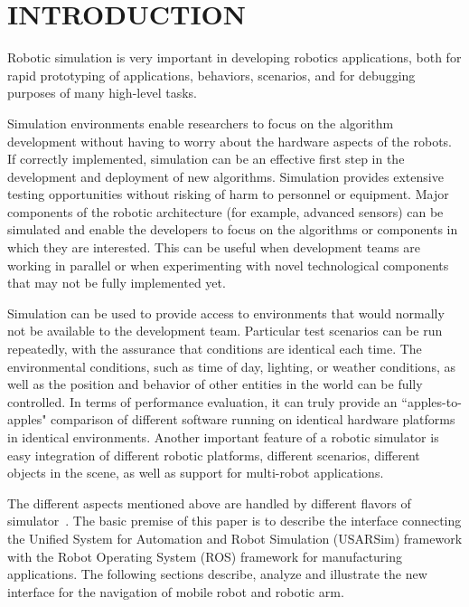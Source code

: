 \section*{INTRODUCTION}

Robotic simulation is very important in developing robotics applications, both
for rapid prototyping of applications, behaviors, scenarios, and for debugging
purposes of many high-level tasks.

Simulation environments enable researchers to focus on the algorithm development without having to worry about the hardware aspects of the robots. If correctly implemented, simulation can be an effective first step in the development and deployment of new algorithms. Simulation provides extensive testing opportunities without risking of harm to personnel or equipment. Major components of the robotic architecture (for example, advanced sensors) can be simulated and enable the developers to focus on the algorithms or components in which they are interested. This can be useful when development teams are working in parallel or when experimenting with novel technological components that may not be fully implemented yet.

Simulation can be used to provide access to environments that would normally not be available to the development team. Particular test scenarios can be run repeatedly, with the assurance that conditions are identical each time. The environmental conditions, such as time of day, lighting, or weather conditions, as well as the position and behavior of other entities in the world can be fully controlled. In terms of performance evaluation, it can truly provide an ``apples-to-apples" comparison of different software running on identical hardware platforms in identical environments. Another important feature of a robotic simulator is easy integration of different robotic platforms, different scenarios, different objects in the scene, as well
as support for multi-robot applications.

The different aspects mentioned above are handled by different flavors of simulator~\cite{ZARATTI.LNAI.2007}.
The basic premise of this paper is to describe the interface connecting the Unified System for Automation and Robot Simulation (USARSim) framework with the Robot Operating System (ROS) framework for manufacturing applications. The following sections describe, analyze and illustrate the new interface for the navigation of mobile robot and robotic arm.

